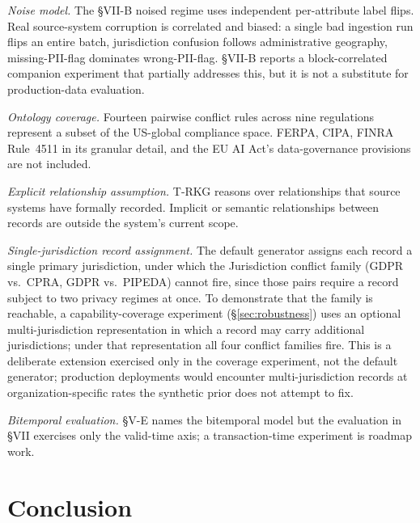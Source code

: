 \documentclass{ieeeaccess}
\begin{document}
\textit{Noise model.} The §VII-B noised regime uses independent per-attribute label flips. Real source-system corruption is correlated and biased: a single bad ingestion run flips an entire batch, jurisdiction confusion follows administrative geography, missing-PII-flag dominates wrong-PII-flag. §VII-B reports a block-correlated companion experiment that partially addresses this, but it is not a substitute for production-data evaluation.

\textit{Ontology coverage.} Fourteen pairwise conflict rules across nine regulations represent a subset of the US-global compliance space. FERPA, CIPA, FINRA Rule~4511 in its granular detail, and the EU AI Act's data-governance provisions are not included.

\textit{Explicit relationship assumption.} T-RKG reasons over relationships that source systems have formally recorded. Implicit or semantic relationships between records are outside the system's current scope.

\textit{Single-jurisdiction record assignment.} The default generator assigns each record a single primary jurisdiction, under which the Jurisdiction conflict family (GDPR vs.\ CPRA, GDPR vs.\ PIPEDA) cannot fire, since those pairs require a record subject to two privacy regimes at once. To demonstrate that the family is reachable, a capability-coverage experiment (§\ref{sec:robustness}) uses an optional multi-jurisdiction representation in which a record may carry additional jurisdictions; under that representation all four conflict families fire. This is a deliberate extension exercised only in the coverage experiment, not the default generator; production deployments would encounter multi-jurisdiction records at organization-specific rates the synthetic prior does not attempt to fix.

\textit{Bitemporal evaluation.} §V-E names the bitemporal model but the evaluation in §VII exercises only the valid-time axis; a transaction-time experiment is roadmap work.

\section{Conclusion}
\end{document}
